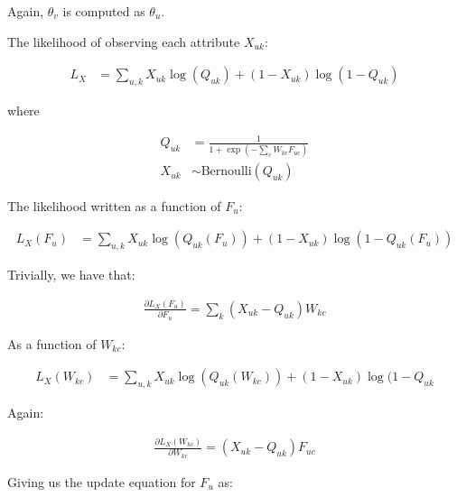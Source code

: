 \documentclass{article}
\begin{document}
	Again, $\theta_v$ is computed as $\theta_u$.
	
	\hrulefill
	
	\pagebreak
	
	\hrulefill
	
	The likelihood of observing each attribute $X_{uk}$:
	
	\begin{align}
	L_X &= \sum_{u,k} X_{uk} \log(Q_{uk}) + (1 - X_{uk}) \log(1 - Q_{uk})
	\end{align}
	
	where 
	
	\begin{align}
	Q_{uk} &= \frac{1}{1 + \exp(- \sum_c W_{kc} F_{uc})} \\
	X_{uk} & \sim \text{Bernoulli}(Q_{uk}) 
	\end{align}
	
	\hrulefill
	
	The likelihood written as a function of $F_u$:
	
	\begin{align}
	L_X(F_u) &= \sum_{u,k} X_{uk} \log(Q_{uk}(F_u)) + (1 - X_{uk}) \log(1 - Q_{uk}(F_u))
	\end{align}
	
	\hrulefill
	
	Trivially, we have that:
	
	\begin{align}
	\frac{\partial L_X (F_u)}{\partial F_u} = \sum_k (X_{uk} - Q_{uk}) W_{kc}
	\end{align}
	
	\hrulefill
	
	As a function of $W_{kc}$:
	
	\begin{align}
	L_X(W_{kc}) &= \sum_{u,k} X_{uk} \log(Q_{uk}(W_{kc})) + (1 - X_{uk}) \log(1 - Q_{uk}
	\end{align}
	
	\hrulefill
	
	Again:
	
	\begin{align}
	\frac{\partial L_X (W_{kc})}{\partial W_{kc}} = (X_{uk} - Q_{uk}) F_{uc}
	\end{align}
	
	\pagebreak
	
	
	\hrulefill
	
	Giving us the update equation for $F_u$ as:
	
\end{document}
